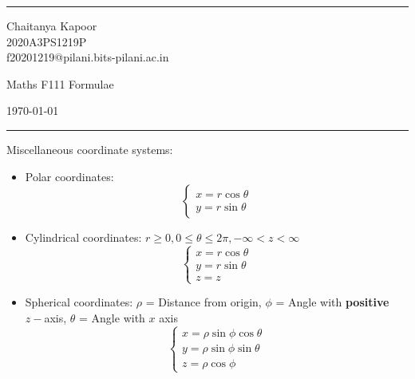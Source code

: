 \documentclass[a4paper]{article}
\begin{document}

\fancyhead[C]{}
\hrule \medskip %
\begin{minipage}{0.295\textwidth} 
\raggedright
\footnotesize
Chaitanya Kapoor \hfill\\   
2020A3PS1219P\hfill\\
f20201219@pilani.bits-pilani.ac.in
\end{minipage}
\begin{minipage}{0.4\textwidth} 
\centering 
\Large
Maths F111 Formulae
\end{minipage}
\begin{minipage}{0.295\textwidth} 
\raggedleft
\today\hfill\\
\end{minipage}
\medskip\hrule 
\bigskip
Miscellaneous coordinate systems:
\begin{itemize}
    \item Polar coordinates: \[\begin{cases}
                                 x=r\cos{\theta}\\
                                 y=r\sin{\theta}
                            \end{cases}\]
    \item Cylindrical coordinates: $r\geq 0, 0\leq \theta \leq 2\pi, -\infty < z < \infty$
                            \[\begin{cases}
                                 x=r\cos{\theta}\\
                                 y=r\sin{\theta}\\
                                 z=z 
                            \end{cases}\]
    \item Spherical coordinates: $\rho$ = Distance from origin, $\phi$ = Angle with \textbf{positive} $z-$axis, $\theta$ = Angle with $x$ axis
                            \[\begin{cases}
                                 x=\rho\sin{\phi}\cos{\theta}\\
                                 y=\rho\sin{\phi}\sin{\theta}\\
                                 z=\rho\cos{\phi}
                            \end{cases}\]
\end{itemize}
\end{document}

